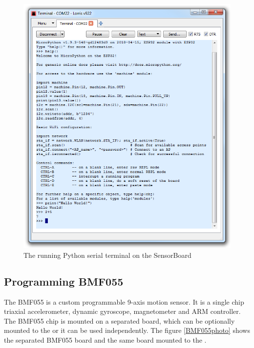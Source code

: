 \begin{figure}
    \centering
    \caption{The running Python serial terminal on the SensorBoard}
    \label{ESP32PythonLorris}
    \includegraphics[width=\linewidth]{img/PythonESP.png}
\end{figure}

\subsection{Programming BMF055}
The BMF055 \cite{bosch:BMF055} is a custom programmable 9-axis motion sensor. It is a single chip triaxial accelerometer, dynamic gyroscope, magnetometer and ARM controller. The BMF055 chip is mounted on a separated board, which can be optionally mounted to the  or it can be used independently. The figure \ref{BMF055photo} shows the separated BMF055 board and the same board mounted to the .

